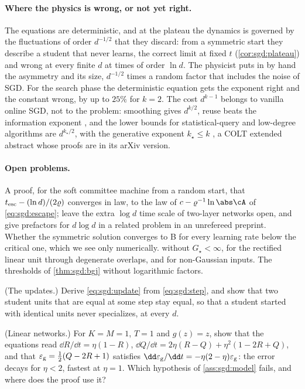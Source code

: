 \begin{refsection}
\paragraph{Where the physics is wrong, or not yet right.} The equations are deterministic, and at the plateau the dynamics is governed by the fluctuations of order $d^{-1/2}$ that they discard: from a symmetric start they describe a student that never learns, the correct limit at fixed $t$ (\cref{cor:sgd:plateau}) and wrong at every finite $d$ at times of order $\ln d$. The physicist puts in by hand the asymmetry and its size, $d^{-1/2}$ times a random factor that includes the noise of SGD. For the search phase the deterministic equation gets the exponent right and the constant wrong, by up to $25\%$ for $k=2$. The cost $d^{k-1}$ belongs to vanilla online SGD, not to the problem: smoothing gives $d^{k/2}$, reuse beats the information exponent \parencite{DamianEtAl2023,LeeEtAl2024,DandiEtAl2024b}, and the lower bounds for statistical-query and low-degree algorithms are $d^{k_\star/2}$, with the generative exponent $k_\star\le k$ \parencite{DamianEtAl2024}, a COLT extended abstract whose proofs are in its arXiv version.

\paragraph{Open problems.} A proof, for the soft committee machine from a random start, that $t_{\mathrm{esc}}-(\ln d)/(2\varrho)$ converges in law, to the law of $c-\varrho^{-1}\ln\abs\cA$ of \eqref{eq:sgd:escape}; \textcite[Section~3]{VeigaEtAl2022} leave the extra $\log d$ time scale of two-layer networks open, and \textcite{ArnaboldiEtAl2023b} give prefactors for $d\log d$ in a related problem in an unrefereed preprint. Whether the symmetric solution converges to B for every learning rate below the critical one, which we see only numerically.  without $G_\star<\infty$, for the rectified linear unit through degenerate overlaps, and for non-Gaussian inputs. The thresholds of \cref{thm:sgd:bgj} without logarithmic factors.

\begin{exercises}
\item \consolidation (The updates.) Derive \eqref{eq:sgd:update} from \eqref{eq:sgd:step}, and show that two student units that are equal at some step stay equal, so that a student started with identical units never specializes, at every $d$.\label{ex:sgd:update}

\item \consolidation (Linear networks.) For $K=M=1$, $T=1$ and $g(z)=z$, show that the equations read $\dd R/\dd t=\eta(1-R)$, $\dd Q/\dd t=2\eta(R-Q)+\eta^2(1-2R+Q)$, and that $\varepsilon_{\mathrm g}=\frac12(Q-2R+1)$ satisfies $\dd\sgdeg/\dd t=-\eta(2-\eta)\sgdeg$: the error decays for $\eta<2$, fastest at $\eta=1$. Which hypothesis of \cref{ass:sgd:model} fails, and where does the proof use it?\label{ex:sgd:linear}


\end{exercises}
\end{refsection}
